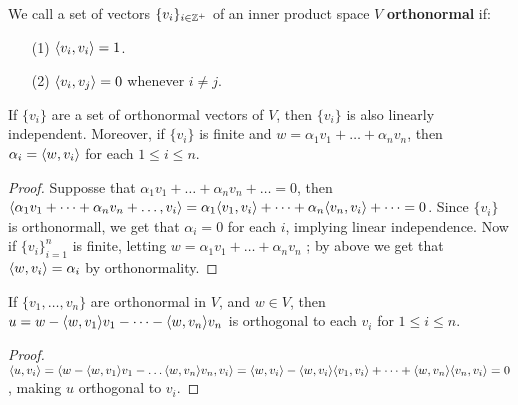 \begin{definition}
    We call a set of vectors $\{v_i\}_{i \in \mathbb{Z}^+}$ of an inner product space $V$
    \textbf{orthonormal} if:
        \begin{enumerate}
            \item[(1)] $\langle v_i,v_i\rangle=1$.

            \item[(2)] $\langle v_i,v_j\rangle=0$ whenever $i \neq j$.
        \end{enumerate}
\end{definition}

\begin{lemma}\label{1.4.5}
    If $\{v_i\}$ are a set of orthonormal vectors of $V$, then  $\{v_i\}$ is also linearly
    independent. Moreover, if $\{v_i\}$ is finite and $w=\alpha_1v_1+\dots+\alpha_nv_n$, then $\alpha_i=\langle w,v_i\rangle$ for
    each $1 \leq i \leq n.$
\end{lemma}
\begin{proof}
    Supposse that $\alpha_1v_1+\dots+\alpha_nv_n+\dots=0$, then
    $\langle \alpha_1v_1+\dots+\alpha_nv_n+\dots,
    v_i\rangle=\alpha_1\langle v_1,v_i\rangle+\dots+\alpha_n\langle v_n,v_i\rangle+\dots=0$. Since $\{v_i\}$ is
    orthonormall, we get that $\alpha_i=0$ for each  $i$, implying linear independence. Now if
    $\{v_i\}_{i=1}^n$ is finite, letting $w=\alpha_1v_1+\dots+\alpha_nv_n$ ; by above we get that
    $\langle w,v_i\rangle=\alpha_i$ by orthonormality.
\end{proof}

\begin{lemma}\label{1.4.6}
    If $\{v_1, \dots, v_n\}$ are orthonormal in $V$, and  $w \in V$, then
    $u=w-\langle w,v_1\rangle v_1-\dots-\langle w,v_n\rangle v_n$ is orthogonal to each $v_i$ for  $1 \leq i \leq
    n$.
\end{lemma}
\begin{proof}
    $\langle u,v_i\rangle=\langle w-\langle w,v_1\rangle v_1-\dots\langle w,v_n\rangle v_n,
    v_i\rangle=\langle w,v_i\rangle-\langle w,v_i\rangle\langle v_1,v_i\rangle+\dots+\langle w,v_n\rangle\langle v_n,v_i\rangle=0$,
    making $u$ orthogonal to  $v_i$.
\end{proof}


